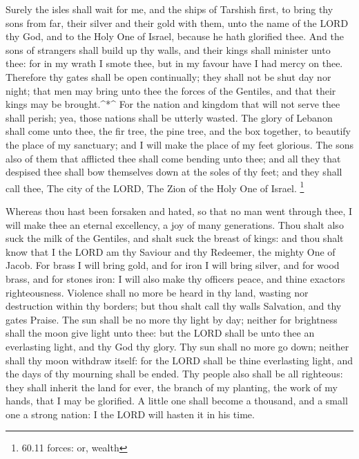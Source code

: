  Surely the isles shall wait for me, and the ships of
Tarshish first, to bring thy sons from far, their silver and their gold
with them, unto the name of the LORD thy God, and to the Holy One of
Israel, because he hath glorified thee.  And the sons of
strangers shall build up thy walls, and their kings shall minister unto
thee: for in my wrath I smote thee, but in my favour have I had mercy on
thee.  Therefore thy gates shall be open continually; they
shall not be shut day nor night; that men may bring unto thee the forces
of the Gentiles, and that their kings may be brought.\^{}*\^{}
 For the nation and kingdom that will not serve thee shall
perish; yea, those nations shall be utterly wasted.  The
glory of Lebanon shall come unto thee, the fir tree, the pine tree, and
the box together, to beautify the place of my sanctuary; and I will make
the place of my feet glorious.  The sons also of them that
afflicted thee shall come bending unto thee; and all they that despised
thee shall bow themselves down at the soles of thy feet; and they shall
call thee, The city of the LORD, The Zion of the Holy One of Israel.
\footnote{60.11 forces: or, wealth}

 Whereas thou hast been forsaken and hated, so that no man
went through thee, I will make thee an eternal excellency, a joy of many
generations.  Thou shalt also suck the milk of the
Gentiles, and shalt suck the breast of kings: and thou shalt know that I
the LORD am thy Saviour and thy Redeemer, the mighty One of Jacob.
 For brass I will bring gold, and for iron I will bring
silver, and for wood brass, and for stones iron: I will also make thy
officers peace, and thine exactors righteousness.  Violence
shall no more be heard in thy land, wasting nor destruction within thy
borders; but thou shalt call thy walls Salvation, and thy gates Praise.
 The sun shall be no more thy light by day; neither for
brightness shall the moon give light unto thee: but the LORD shall be
unto thee an everlasting light, and thy God thy glory.  Thy
sun shall no more go down; neither shall thy moon withdraw itself: for
the LORD shall be thine everlasting light, and the days of thy mourning
shall be ended.  Thy people also shall be all righteous:
they shall inherit the land for ever, the branch of my planting, the
work of my hands, that I may be glorified.  A little one
shall become a thousand, and a small one a strong nation: I the LORD
will hasten it in his time.

